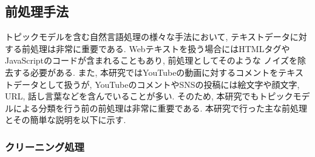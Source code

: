 \documentclass{ltjarticle}
\begin{document}
\subsection{前処理手法}
トピックモデルを含む自然言語処理の様々な手法において, テキストデータに対する前処理は非常に重要である. 
Webテキストを扱う場合にはHTMLタグやJavaScriptのコードが含まれることもあり, 前処理としてそのような
ノイズを除去する必要がある. また, 本研究ではYouTubeの動画に対するコメントをテキストデータとして扱うが, 
YouTubeのコメントやSNSの投稿には絵文字や顔文字, URL, 話し言葉などを含んでいることが多い. 
そのため, 本研究でもトピックモデルによる分類を行う前の前処理は非常に重要である. 
本研究で行った主な前処理とその簡単な説明を以下に示す. 
\vspace{10truept}

\subsubsection{クリーニング処理}
\end{document}
